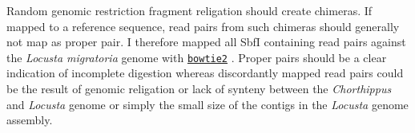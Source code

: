 \documentclass[a4paper,12pt,times,print,index,custombib,custommargin]{PhDThesisPSnPDF}\usepackage[]{graphicx}\usepackage[]{color}
\begin{document}
Random genomic restriction fragment religation should create chimeras. If mapped to a reference sequence, read pairs from such chimeras should generally not map as \gls{proper pair}. I therefore mapped all SbfI containing read pairs against the \textit{Locusta migratoria} genome \citep{Wang2014} with \href{http://bowtie-bio.sourceforge.net/bowtie2/index.shtml}{\texttt{bowtie2}} \citep{Langmead2012}. Proper pairs should be a clear indication of incomplete digestion whereas \gls{discordant}ly mapped read pairs could be the result of genomic religation or lack of synteny between the \textit{Chorthippus} and \textit{Locusta} genome or simply the small size of the contigs in the \textit{Locusta} genome assembly.
%
%
\end{document}
